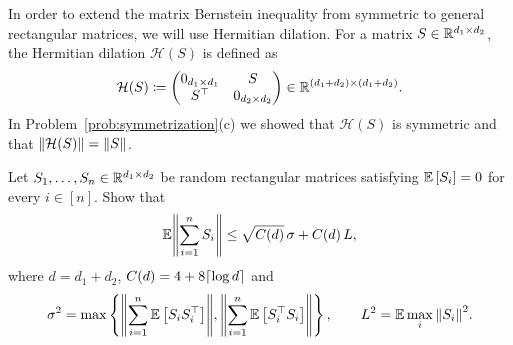 \begin{myexercise}\label{prob:hermitian_dilation}
    In order to extend the matrix Bernstein inequality from symmetric to general rectangular matrices, we will use Hermitian dilation. For a matrix $S \in \mathbb{R}^{d_1 \times d_2}$, the Hermitian dilation $\mathcal{H}(S)$ is defined as
    \begin{equation*}
        \mathcal{H}(S) \coloneqq \begin{pmatrix}
            0_{d_1 \times d_1} & S \\
            S^\top & 0_{d_2 \times d_2}
        \end{pmatrix}\in\mathbb{R}^{(d_1 + d_2)\times (d_1 + d_2)}.
    \end{equation*}
    In Problem~\ref{prob:symmetrization}(c) we showed that $\mathcal{H}(S)$ is symmetric and that ${\left\lVert{\mathcal{H}(S)}\right\rVert} = {\left\lVert{S}\right\rVert}$.
    
    Let $S_1, \dots, S_n \in \mathbb{R}^{d_1 \times d_2}$ be random rectangular matrices satisfying $\mathbb{E}\left[ S_i \right] = 0$ for every $i \in [n]$. Show that 
    \begin{equation*}
        \mathbb{E} {\left\lVert{ \sum_{i=1}^n S_i }\right\rVert} \le \sqrt{C(d)}\, \sigma + C(d)\, L,
    \end{equation*}
    where $d = d_1 + d_2$, $C(d)  = 4 + 8 \lceil \log d \rceil$ and
    \begin{equation*}
        \sigma^2 = \max \left\{ {\left\lVert{ \sum_{i=1}^n \mathbb{E}\left[ S_i S_i^\top \right]}\right\rVert},  {\left\lVert{ \sum_{i=1}^n \mathbb{E}\left[ S_i^\top S_i \right]}\right\rVert} \right\},\qquad L^2 = \mathbb{E} \max_i {\left\lVert{S_i}\right\rVert}^2.
    \end{equation*}
\end{myexercise}

